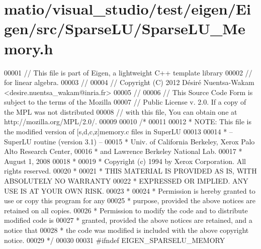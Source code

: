 \hypertarget{matio_2visual__studio_2test_2eigen_2_eigen_2src_2_sparse_l_u_2_sparse_l_u___memory_8h_source}{}\section{matio/visual\+\_\+studio/test/eigen/\+Eigen/src/\+Sparse\+L\+U/\+Sparse\+L\+U\+\_\+\+Memory.h}
\label{matio_2visual__studio_2test_2eigen_2_eigen_2src_2_sparse_l_u_2_sparse_l_u___memory_8h_source}

\begin{DoxyCode}
00001 \textcolor{comment}{// This file is part of Eigen, a lightweight C++ template library}
00002 \textcolor{comment}{// for linear algebra.}
00003 \textcolor{comment}{//}
00004 \textcolor{comment}{// Copyright (C) 2012 Désiré Nuentsa-Wakam <desire.nuentsa\_wakam@inria.fr>}
00005 \textcolor{comment}{//}
00006 \textcolor{comment}{// This Source Code Form is subject to the terms of the Mozilla}
00007 \textcolor{comment}{// Public License v. 2.0. If a copy of the MPL was not distributed}
00008 \textcolor{comment}{// with this file, You can obtain one at http://mozilla.org/MPL/2.0/.}
00009 
00010 \textcolor{comment}{/* }
00011 \textcolor{comment}{ }
00012 \textcolor{comment}{ * NOTE: This file is the modified version of [s,d,c,z]memory.c files in SuperLU }
00013 \textcolor{comment}{ }
00014 \textcolor{comment}{ * -- SuperLU routine (version 3.1) --}
00015 \textcolor{comment}{ * Univ. of California Berkeley, Xerox Palo Alto Research Center,}
00016 \textcolor{comment}{ * and Lawrence Berkeley National Lab.}
00017 \textcolor{comment}{ * August 1, 2008}
00018 \textcolor{comment}{ *}
00019 \textcolor{comment}{ * Copyright (c) 1994 by Xerox Corporation.  All rights reserved.}
00020 \textcolor{comment}{ *}
00021 \textcolor{comment}{ * THIS MATERIAL IS PROVIDED AS IS, WITH ABSOLUTELY NO WARRANTY}
00022 \textcolor{comment}{ * EXPRESSED OR IMPLIED.  ANY USE IS AT YOUR OWN RISK.}
00023 \textcolor{comment}{ *}
00024 \textcolor{comment}{ * Permission is hereby granted to use or copy this program for any}
00025 \textcolor{comment}{ * purpose, provided the above notices are retained on all copies.}
00026 \textcolor{comment}{ * Permission to modify the code and to distribute modified code is}
00027 \textcolor{comment}{ * granted, provided the above notices are retained, and a notice that}
00028 \textcolor{comment}{ * the code was modified is included with the above copyright notice.}
00029 \textcolor{comment}{ */}
00030 
00031 \textcolor{preprocessor}{#ifndef EIGEN\_SPARSELU\_MEMORY}

\end{DoxyCode}
